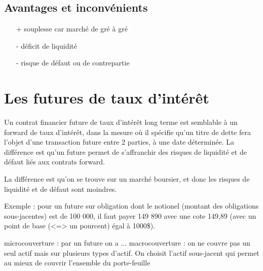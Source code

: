 	\subsection{Avantages et inconvénients}
	
	\begin{itemize}
		\item[+] souplesse car marché de gré à gré
		\item[-] déficit de liquidité
		\item[-] risque de défaut ou de contrepartie 
	\end{itemize}
	
\section{Les futures de taux d'intérêt}

Un contrat financier future de taux d'intérêt long terme est semblable à un forward de taux d'intérêt, dans la mesure où il spécifie qu'un titre de dette fera l'objet d'une transaction future entre 2 parties, à une date déterminée. La différence est qu'un future permet de s'affranchir des risques de liquidité et de défaut liés aux contrats forward.

La différence est qu'on se trouve sur un marché boursier, et donc les risques de liquidité et de défaut sont moindres.

Exemple : pour un future sur obligation dont le notionel (montant des obligations sous-jacentes) est de 100 000, il faut payer 149 890 avec une cote 149,89 (avec un point de base (<=> un pourcent) égal à 1000\$).

microcouverture : par un future on a ...
macrocouverture : on ne couvre pas un seul actif mais sur plusieurs types d'actif. On choisit l'actif sous-jacent qui permet au mieux de couvrir l'ensemble du porte-feuille

